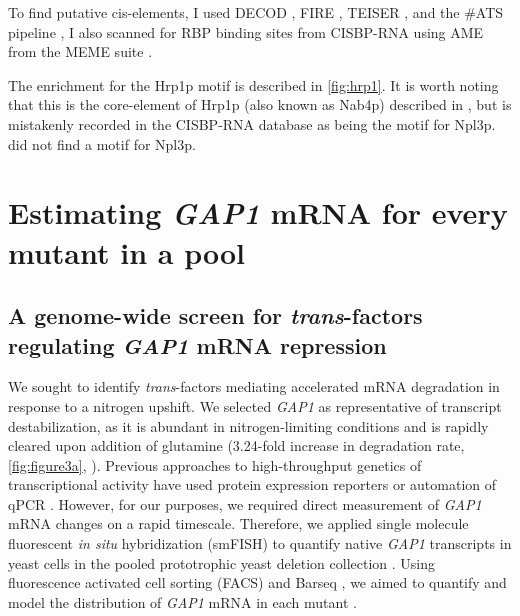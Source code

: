 To find putative cis-elements, 
I used DECOD \parencite{huggins2011decod}, 
FIRE \parencite{elemento2007universal},
TEISER \parencite{goodarzi2012systematic},
and the \#ATS pipeline \parencite{li2010predicting},
I also scanned for RBP binding sites from
CISBP-RNA \parencite{ray2013compendium}
using AME from the MEME suite \parencite{mcleay2010motif}.

The enrichment for the Hrp1p motif is described in \autoref{fig:hrp1}.
It is worth noting that this is the core-element of Hrp1p (also known
as Nab4p) described in \cite{guisbert2005functional,chen1998specific}, 
but is mistakenly recorded in the CISBP-RNA database as being the 
motif for Npl3p. 
\cite{guisbert2005functional} did not find a motif for Npl3p.


\section{Estimating \textit{GAP1} mRNA for every mutant in a pool}

\subsection{A genome-wide screen for \textit{trans}-factors 
  regulating \textit{GAP1} mRNA repression}

We sought to identify \textit{trans}-factors mediating accelerated mRNA
degradation in response to a nitrogen upshift. We selected \textit{GAP1} 
as representative of transcript destabilization, as it is abundant in
nitrogen-limiting conditions and is rapidly cleared upon addition of
glutamine  (3.24-fold increase in degradation rate, \autoref{fig:figure3a},
). Previous approaches to high-throughput
genetics of transcriptional activity have used protein expression
reporters \parencite{neklesa2009genome,sliva2016barcode} or automation of qPCR 
\parencite{worley2016genome}. However, for our
purposes, we required direct measurement of \textit{GAP1} mRNA 
changes on a rapid timescale.
Therefore, we applied single molecule fluorescent \textit{in situ}
hybridization (smFISH) to quantify 
native \textit{GAP1} transcripts in yeast cells in the pooled
prototrophic yeast deletion collection \parencite{vandersluis2014broad}.
Using fluorescence activated cell sorting (FACS) and Barseq
\parencite{smith2009quantitative,robinson2014design,giaever2014yeast},
we aimed to quantify and model the distribution of \textit{GAP1} mRNA
in each mutant \parencite{kinney2010using,peterman2016sort}.

